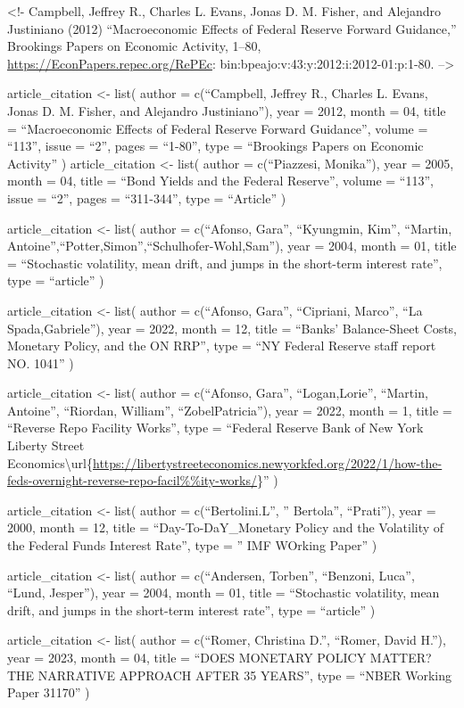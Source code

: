 \documentclass[
]{article}
\begin{document}
\textless!-
Campbell, Jeffrey R., Charles L. Evans, Jonas D. M. Fisher, and Alejandro Justiniano (2012) ``Macroeconomic Effects of Federal Reserve Forward Guidance,'' Brookings Papers on Economic Activity, 1--80, \url{https://EconPapers.repec.org/RePEc}:
bin:bpeajo:v:43:y:2012:i:2012-01:p:1-80.
--\textgreater{}

article\_citation \textless- list(
author = c(``Campbell, Jeffrey R., Charles L. Evans, Jonas D. M. Fisher, and Alejandro Justiniano''),
year = 2012,
month = 04,
title = ``Macroeconomic Effects of Federal Reserve Forward Guidance'',
volume = ``113'',
issue = ``2'',
pages = ``1-80'',
type = ``Brookings Papers on Economic Activity''
)
article\_citation \textless- list(
author = c(``Piazzesi, Monika''),
year = 2005,
month = 04,
title = ``Bond Yields and the Federal Reserve'',
volume = ``113'',
issue = ``2'',
pages = ``311-344'',
type = ``Article''
)

article\_citation \textless- list(
author = c(``Afonso, Gara'', ``Kyungmin, Kim'', ``Martin, Antoine'',``Potter,Simon'',``Schulhofer-Wohl,Sam''),
year = 2004,
month = 01,
title = ``Stochastic volatility, mean drift, and jumps in the short-term interest rate'',
type = ``article''
)

article\_citation \textless- list(
author = c(``Afonso, Gara'', ``Cipriani, Marco'', ``La Spada,Gabriele''),
year = 2022,
month = 12,
title = ``Banks' Balance-Sheet Costs, Monetary Policy, and the ON RRP'',
type = ``NY Federal Reserve staff report NO. 1041''
)

article\_citation \textless- list(
author = c(``Afonso, Gara'', ``Logan,Lorie'', ``Martin, Antoine'', ``Riordan, William'', ``ZobelPatricia''),
year = 2022,
month = 1,
title = ``Reverse Repo Facility Works'',
type = ``Federal Reserve Bank of New York Liberty Street Economics\textbackslash url\{\url{https://libertystreeteconomics.newyorkfed.org/2022/1/how-the-feds-overnight-reverse-repo-facil\%\%ity-works/}\}''
)

article\_citation \textless- list(
author = c(``Bertolini.L'', '' Bertola'', ``Prati''),
year = 2000,
month = 12,
title = ``Day-To-DaY\_Monetary Policy and the Volatility of the Federal Funds Interest Rate'',
type = '' IMF WOrking Paper''
)

article\_citation \textless- list(
author = c(``Andersen, Torben'', ``Benzoni, Luca'', ``Lund, Jesper''),
year = 2004,
month = 01,
title = ``Stochastic volatility, mean drift, and jumps in the short-term interest rate'',
type = ``article''
)

article\_citation \textless- list(
author = c(``Romer, Christina D.'', ``Romer, David H.''),
year = 2023,
month = 04,
title = ``DOES MONETARY POLICY MATTER? THE NARRATIVE APPROACH AFTER 35 YEARS'',
type = ``NBER Working Paper 31170''
)
\end{document}
